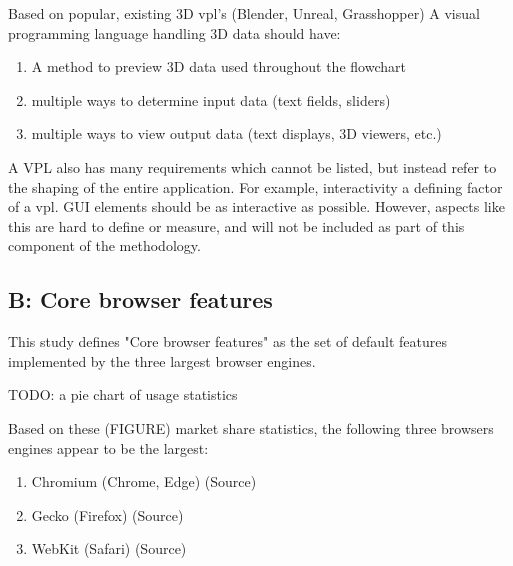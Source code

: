 Based on popular, existing 3D vpl's (Blender, Unreal, Grasshopper) A visual programming language handling 3D data should have:
\begin{enumerate}[-]
  \item A method to preview 3D data used throughout the flowchart
  \item multiple ways to determine input data (text fields, sliders) 
  \item multiple ways to view output data (text displays, 3D viewers, etc.)
\end{enumerate}

A VPL also has many requirements which cannot be listed, but instead refer to the shaping of the entire application. 
For example, interactivity a defining factor of a vpl. GUI elements should be as interactive as possible.
However, aspects like this are hard to define or measure, and will not be included as part of this component of the methodology. 

 


\subsection*{B: Core browser features}
This study defines "Core browser features" as the set of default features implemented by the three largest browser engines. 
\begin{note}
TODO: a pie chart of usage statistics
\end{note}
Based on these (FIGURE) market share statistics, the following three browsers engines appear to be the largest:
\begin{enumerate}[-]
  \item Chromium (Chrome, Edge) (Source)
  \item Gecko (Firefox) (Source)
  \item WebKit (Safari) (Source)
\end{enumerate}

